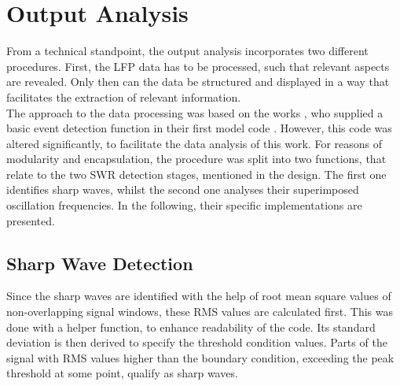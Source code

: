 \section{Output Analysis}
From a technical standpoint, the output analysis incorporates two different procedures. First, the LFP data has to be processed, such that relevant aspects are revealed. Only then can the data be structured and displayed in a way that facilitates the extraction of relevant information.\\
The approach to the data processing was based on the works \textcite{Aussel.2018}, who supplied a basic event detection function in their first model code \cite{HippSimModel.1}. However, this code was altered significantly, to facilitate the data analysis of this work. For reasons of modularity and encapsulation, the procedure was split into two functions, that relate to the two SWR detection stages, mentioned in the design. The first one identifies sharp waves, whilst the second one analyses their superimposed oscillation frequencies. In the following, their specific implementations are presented.

    \subsection{Sharp Wave Detection}
    Since the sharp waves are identified with the help of root mean square values of non-overlapping signal windows, these RMS values are calculated first. This was done with a helper function, to enhance readability of the code. Its standard deviation is then derived to specify the threshold condition values. Parts of the signal with RMS values higher than the boundary condition, exceeding the peak threshold at some point, qualify as sharp waves.\\
    

